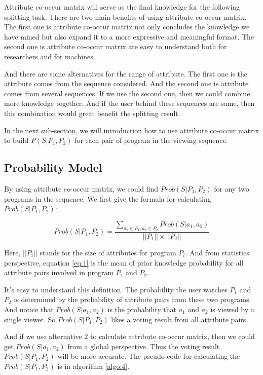 Attribute co-occur matrix will serve as the final knowledge for the following splitting task. There are two main benefits of using
attribute co-occur matrix. The first one is attribute co-occur matrix not only concludes the knowledge we have mined but also expand
it to a more expressive and meaningful format. The second one is attribute co-occur matrix are easy to understand both for researchers
and for machines.

And there are some alternatives for the range of attribute. The first one is the attribute comes from the sequence considered. And the
second one is attribute comes from several sequences. If we use the second one, then we could combine more knowledge together. And if
the user behind these sequences are same, then this combination would great benefit the splitting result.

In the next sub-section, we will introduction how to use attribute co-occur matrix to build $P(S|P_1,P_2)$ for each pair of program in the
viewing sequence.

\subsection{Probability Model}
By using attribute co-occur matrix, we could find $Prob(S|P_1,P_2)$ for any two programs in the sequence. We first give the formula for
calculating $Prob(S|P_1,P_2)$:

\begin{equation}
Prob(S|P_1,P_2)=\frac{\sum_{a_1 \in P_1, a_2 \in P_2}{Prob(S|a_1, a_2)}}{||P_1||\times||P_2||}
\label{eq:1}
\end{equation}

Here, $||P_i||$ stands for the size of attributes for program $P_i$. And from statistics perspective, equation \ref{eq:1} is the mean
of prior knowledge probability for all attribute pairs involved in program $P_1$ and $P_2$.

It's easy to understand this definition. The probability the user watches $P_1$ and $P_2$ is determined by the probability of attribute pairs from these
two programs. And notice that $Prob(S|a_1,a_2)$ is the probability that $a_1$ and $a_2$ is viewed by a single viewer. So $Prob(S|P_1,P_2)$ likes a voting
result from all attribute pairs.

And if we use alternative 2 to calculate attribute co-occur matrix, then we could get $Prob(S|a_1,a_2)$ from a global perspective. Thus the voting result
$Prob(S|P_1,P_2)$ will be more accurate. The pseudo-code for calculating the $Prob(S|P_1,P_2)$ is in algorithm \ref{algo:4}.

